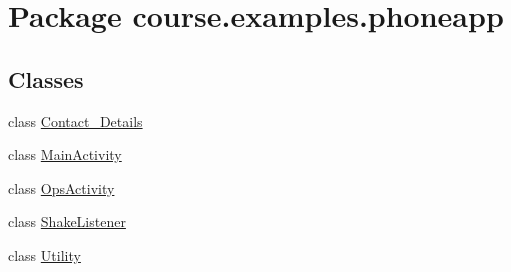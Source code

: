 \hypertarget{namespacecourse_1_1examples_1_1phoneapp}{}\section{Package course.\+examples.\+phoneapp}
\label{namespacecourse_1_1examples_1_1phoneapp}
\subsection*{Classes}
\begin{DoxyCompactItemize}
\item 
class \hyperlink{classcourse_1_1examples_1_1phoneapp_1_1_contact___details}{Contact\+\_\+\+Details}
\item 
class \hyperlink{classcourse_1_1examples_1_1phoneapp_1_1_main_activity}{Main\+Activity}
\item 
class \hyperlink{classcourse_1_1examples_1_1phoneapp_1_1_ops_activity}{Ops\+Activity}
\item 
class \hyperlink{classcourse_1_1examples_1_1phoneapp_1_1_shake_listener}{Shake\+Listener}
\item 
class \hyperlink{classcourse_1_1examples_1_1phoneapp_1_1_utility}{Utility}
\end{DoxyCompactItemize}
